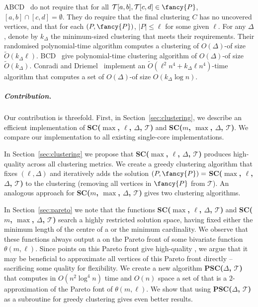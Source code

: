 \documentclass[english, thm-restate]{lipics-v2021}
\begin{document}
ABCD~\cite{bruning_subtrajectory_2023} do not require that for all $\mathcal{T}[a, b], \mathcal{T}[c, d] \in {\fancy{P}}$, $[a, b] \cap [c, d] = \emptyset$. They do require that the final clustering $C$ has no uncovered vertices, and that for each \pathlet $(P, {\fancy{P}})$, $|P| \leq \ell$ for some given $\ell$. For any $\Delta$, denote by $k_\Delta$ the minimum-sized clustering that meets their requirements. Their randomised polynomial-time algorithm computes  a clustering of $O(\Delta)$-\pathlets of size $\tilde{O}(k_\Delta \ell)$.
BCD~\cite{bruning2022faster} give polynomial-time clustering algorithm of $O(\Delta)$-\pathlets of size $\tilde{O}(k_\Delta)$.  
Conradi and Driemel~\cite{conradi2023finding} implement an $\tilde{O}(\ell^2 n^4 + k_\Delta \ell n^4)$-time algorithm that computes a set of $O(\Delta)$-\pathlets of size $O(k_\Delta \log n)$. 

\subparagraph{Contribution.} Our contribution is threefold.
First, in Section~\ref{sec:clustering}, we describe an efficient implementation of \textbf{SC($\max$, $\ell$, $\Delta$, $\mathcal{T}$)} and \textbf{SC($m$, $\max$, $\Delta$, $\mathcal{T}$)}.
We compare our implementation to all existing single-core implementations. 

In Section~\ref{sec:clustering} we propose that \textbf{SC($\max$, $\ell$, $\Delta$, $\mathcal{T}$)} produces high-quality \pathlets across all clustering metrics. 
We create a greedy clustering algorithm that fixes $(\ell, \Delta)$ and iteratively adds the solution $(P, {\fancy{P}}) =$ \textbf{SC($\max$, $\ell$, $\Delta$, $\mathcal{T}$)} to the clustering (removing all vertices in ${\fancy{P}}$ from $\mathcal{T}$). An analogous approach for \textbf{SC($m$, $\max$, $\Delta$, $\mathcal{T}$)} gives two clustering algorithms. 

In Section~\ref{sec:pareto} we note that the functions \textbf{SC($\max$, $\ell$, $\Delta$, $\mathcal{T}$)} and \textbf{SC($m$, $\max$, $\Delta$, $\mathcal{T}$)} search a highly restricted solution space, having fixed either the minimum length of the centre of a \pathlet or the minimum cardinality. 
We observe that these functions always output a \pathlet on the Pareto front of some bivariate function $\theta(m, \ell)$. 
Since points on this Pareto front give high-quality \pathlets, we argue that it may be beneficial to approximate all vertices of this Pareto front directly -- sacrificing some \pathlet quality for \pathlet flexibility. 
We create a new algorithm \textbf{PSC($\Delta$, $\mathcal{T}$)} that computes in $O( n^2 \log^4 n)$ time and $O(n)$ space a set of \pathlets that is a $2$-approximation of the Pareto font of $\theta(m, \ell)$. 
We show that using \textbf{PSC($\Delta$, $\mathcal{T}$)}  as a  subroutine for greedy clustering gives even better results. 
\end{document}
